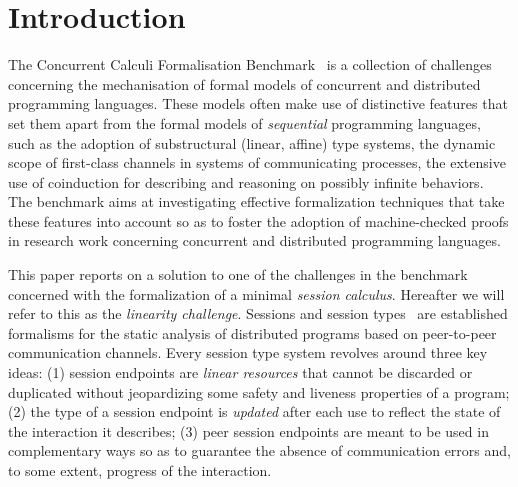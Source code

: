 \section{Introduction}
\label{sec:introduction}

The Concurrent Calculi Formalisation Benchmark~\citep{CarboneEtAl24} is a
collection of challenges concerning the mechanisation of formal models of
concurrent and distributed programming languages.
%
These models often make use of distinctive features that set them apart from the
formal models of \emph{sequential} programming languages, such as the adoption
of substructural (linear, affine) type systems, the dynamic scope of first-class
channels in systems of communicating processes, the extensive use of coinduction
for describing and reasoning on possibly infinite behaviors.
%
The benchmark aims at investigating effective formalization techniques that take
these features into account so as to foster the adoption of machine-checked
proofs in research work concerning concurrent and distributed programming
languages.

This paper reports on a solution to one of the challenges in the benchmark
concerned with the formalization of a minimal \emph{session calculus}. Hereafter
we will refer to this as the \emph{linearity challenge}.
%
Sessions and session types~\citep{Honda93,HondaVasconcelosKubo98,HuttelEtAl16}
are established formalisms for the static analysis of distributed programs based
on peer-to-peer communication channels. Every session type system revolves
around three key ideas: (1) session endpoints are \emph{linear resources} that
cannot be discarded or duplicated without jeopardizing some safety and liveness
properties of a program; (2) the type of a session endpoint is \emph{updated}
after each use to reflect the state of the interaction it describes; (3) peer
session endpoints are meant to be used in complementary ways so as to guarantee
the absence of communication errors and, to some extent, progress of the
interaction.

